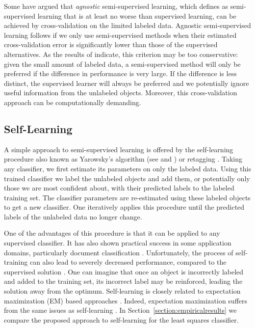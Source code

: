 \documentclass[twoside]{memoir}\usepackage[]{graphicx}\usepackage{xcolor}
\begin{document}
Some \citep{Goldberg2009,Wang2007a} have argued that \emph{agnostic} semi-supervised learning, which \citet{Goldberg2009} defines as semi-supervised learning that is at least no worse than supervised learning, can be achieved by cross-validation on the limited labeled data. 
Agnostic semi-supervised learning follows if we only use semi-supervised methods when their estimated cross-validation error is significantly lower than those of the supervised alternatives.
As the results of \citet{Goldberg2009} indicate, this criterion may be too conservative: given the small amount of labeled data, a semi-supervised method will only be preferred if the difference in performance is very large. 
If the difference is less distinct, the supervised learner will always be preferred and we potentially ignore useful information from the unlabeled objects. 
Moreover, this cross-validation approach can be computationally demanding. 

\subsection*{Self-Learning}
A simple approach to semi-supervised learning is offered by the self-learning procedure \citep{McLachlan1975} also known as Yarowsky's algorithm (see \citep{Abney2004} and \citep{Yarowsky1995}) or retagging \citep{Elworthy1994}.
Taking any classifier, we first estimate its parameters on only  the labeled data. 
Using this trained classifier we label the unlabeled objects and add them, or potentially only those we are most confident about, with their predicted labels to the labeled training set. 
The classifier parameters are re-estimated using these labeled objects to get a new classifier. 
One iteratively applies this procedure until the predicted labels of the unlabeled data no longer change.

One of the advantages of this procedure is that it can be applied to any supervised classifier.
It has also shown practical success in some application domains, particularly document classification \citep{Nigam2000,Yarowsky1995}.
Unfortunately, the process of self-training can also lead to severely decreased performance, compared to the supervised solution \citep{Cozman2006,Cozman2003}. 
One can imagine that once an object is incorrectly labeled and added to the training set, its incorrect label may be reinforced, leading the solution away from the optimum. 
Self-learning is closely related to expectation maximization (EM) based approaches \citep{Abney2004}. Indeed, expectation maximization suffers from the same issues as self-learning \citep{Zhu2009}.
In Section~\ref{section:empiricalresults} we compare the proposed approach to self-learning for the least squares classifier.
\end{document}
